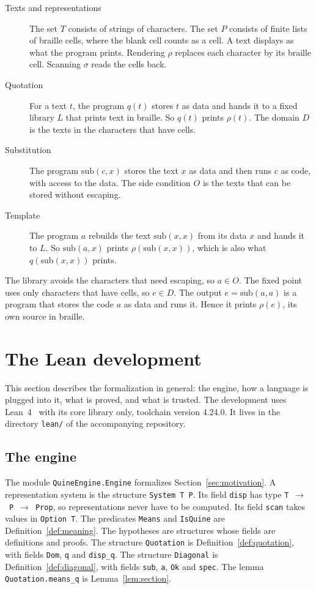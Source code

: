\documentclass[11pt]{amsart}
\theoremstyle{definition}
\theoremstyle{remark}
\newcommand{\sub}{\mathrm{sub}}
\newcommand{\rend}{\rho}
\newcommand{\scan}{\sigma}
\newcommand{\lean}[1]{\texttt{#1}}
\begin{document}
\begin{description}
\item[Texts and representations] The set $T$ consists of strings of characters. The set
$P$ consists of finite lists of braille cells, where the blank cell counts as a cell. A text
displays as what the program prints. Rendering
$\rend$ replaces each
character by its braille cell. Scanning $\scan$ reads the cells back.
\item[Quotation] For a text $t$, the program $q(t)$ stores $t$ as data and hands it to a fixed
library $L$ that prints text in braille. So $q(t)$ prints $\rend(t)$. The domain $D$ is the texts
in the characters that have cells.
\item[Substitution] The program $\sub(c,x)$ stores the text $x$ as data and then runs $c$ as code,
with access to the data. The side condition $O$ is the texts that can be stored without escaping.
\item[Template] The program $a$ rebuilds the text $\sub(x,x)$ from its data $x$ and hands it to
$L$. So $\sub(a,x)$ prints $\rend(\sub(x,x))$, which is also what $q(\sub(x,x))$ prints.
\end{description}

The library avoids the characters that need escaping, so $a \in O$. The fixed point uses only
characters that have cells, so $e \in D$. The output $e = \sub(a,a)$ is a program that stores the
code $a$ as data and runs it. Hence it prints $\rend(e)$, its own source in braille.

\section{The Lean development}\label{sec:lean}
\sloppy

This section describes the formalization in general: the engine, how a language is plugged into it,
what is proved, and what is trusted. The development uses Lean~4~\cite{Lean4} with its core library
only, toolchain version 4.24.0. It lives in the directory \lean{lean/} of the accompanying
repository.

\subsection{The engine}

The module \lean{QuineEngine.Engine} formalizes Section~\ref{sec:motivation}. A representation
system is the structure \lean{System T P}. Its field \lean{disp} has type
\lean{T}~$\to$~\lean{P}~$\to$~\lean{Prop}, so representations never have to be computed. Its field
\lean{scan} takes values in \lean{Option T}. The predicates \lean{Means} and \lean{IsQuine}
are Definition~\ref{def:meaning}. The hypotheses are structures whose fields
are definitions and proofs. The structure \lean{Quotation} is Definition~\ref{def:quotation}, with
fields \lean{Dom}, \lean{q} and \lean{disp\_q}. The structure \lean{Diagonal} is
Definition~\ref{def:diagonal}, with fields \lean{sub},
\lean{a}, \lean{Ok} and \lean{spec}. The lemma \lean{Quotation.means\_q} is
Lemma~\ref{lem:section}.
\end{document}
